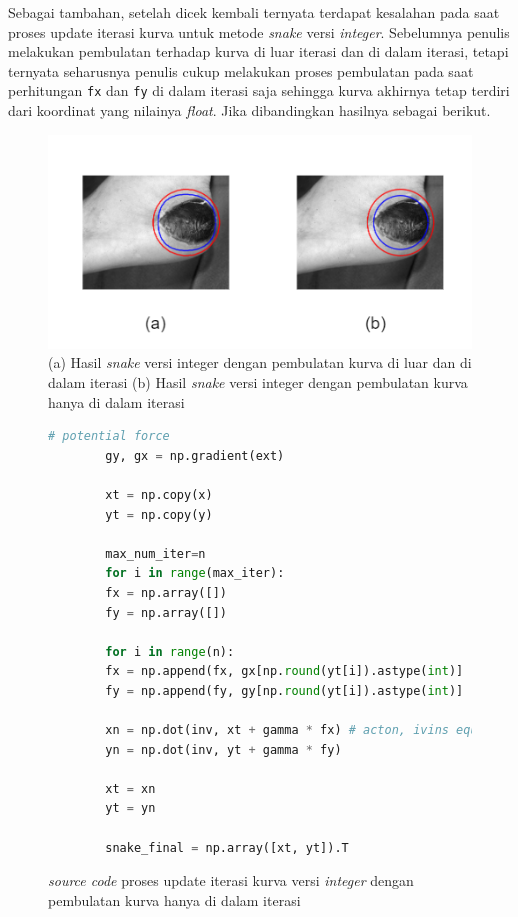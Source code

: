 Sebagai tambahan, setelah dicek kembali ternyata terdapat kesalahan pada saat proses update iterasi kurva untuk metode \emph{snake} versi \emph{integer}. Sebelumnya penulis melakukan pembulatan terhadap kurva di luar iterasi dan di dalam iterasi, tetapi ternyata seharusnya penulis cukup melakukan proses pembulatan pada saat perhitungan \texttt{fx} dan \texttt{fy} di dalam iterasi saja sehingga kurva akhirnya tetap terdiri dari koordinat yang nilainya \emph{float}. Jika dibandingkan hasilnya sebagai berikut.
\begin{figure}[H]
	\centering
	\includegraphics[width=1\textwidth]{gambar/compare_int}
	\caption{(a) Hasil \emph{snake} versi integer dengan pembulatan kurva di luar dan di dalam iterasi  (b) Hasil \emph{snake} versi integer dengan pembulatan kurva hanya di dalam iterasi}
	\label{Gambar:compare_int}
\end{figure}

\begin{figure}[H]
	\begin{lstlisting}[language=Python, basicstyle=\tiny]
		# potential force
		gy, gx = np.gradient(ext)
		
		xt = np.copy(x)
		yt = np.copy(y)
		
		max_num_iter=n
		for i in range(max_iter):
		fx = np.array([])
		fy = np.array([])
		
		for i in range(n):
		fx = np.append(fx, gx[np.round(yt[i]).astype(int)] [np.round(xt[i]).astype(int)] )
		fy = np.append(fy, gy[np.round(yt[i]).astype(int)] [np.round(xt[i]).astype(int)] )
		
		xn = np.dot(inv, xt + gamma * fx) # acton, ivins equation
		yn = np.dot(inv, yt + gamma * fy)
		
		xt = xn
		yt = yn
		
		snake_final = np.array([xt, yt]).T
	\end{lstlisting}
	\caption{\emph{source code} proses update iterasi kurva versi \emph{integer} dengan pembulatan kurva hanya di dalam iterasi}
	\label{code:snake_evol_int_2}
\end{figure}



